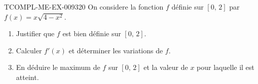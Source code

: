 \begin{exercice}{TCOMPL-ME-EX-009}{3}{20}
On considere la fonction $f$ définie sur $[0,\, 2]$ par $f(x) = x\sqrt{4 - x^2}$.
\begin{enumerate}
  \item Justifier que $f$ est bien définie sur $[0,\, 2]$.
  \item Calculer $f'(x)$ et déterminer les variations de $f$.
  \item En déduire le maximum de $f$ sur $[0,\, 2]$ et la valeur de $x$ pour laquelle il est atteint.
\end{enumerate}

\end{exercice}
